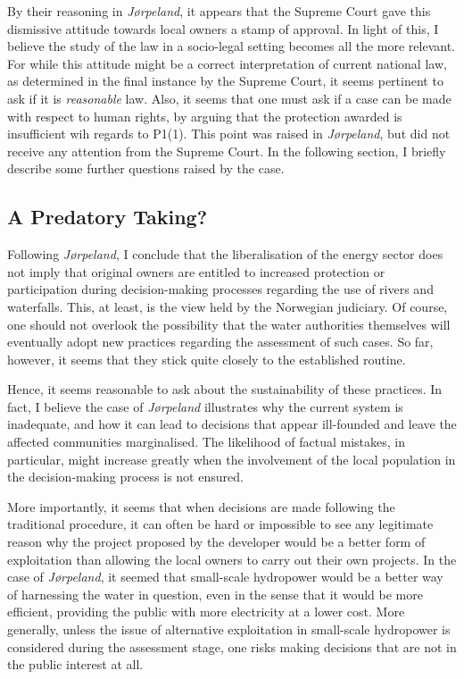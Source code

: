 By their reasoning in \emph{Jørpeland}, it appears that the Supreme Court gave this dismissive attitude towards local owners a stamp of approval. In light of this, I believe the study of the law in a socio-legal setting becomes all the more relevant. For while this attitude might be a correct interpretation of current national law, as determined in the final instance by the Supreme Court, it seems pertinent to ask if it is \emph{reasonable} law. Also, it seems that one must ask if a case can be made with respect to human rights, by arguing that the protection awarded is insufficient wih regards to P1(1). This point was raised in \emph{Jørpeland}, but did not receive any attention from the Supreme Court. In the following section, I briefly describe some further questions raised by the case.

\subsection{A Predatory Taking?}

Following \emph{Jørpeland}, I conclude that the liberalisation of the energy sector does not imply that original owners are entitled to increased protection or participation during decision-making processes regarding the use of rivers and waterfalls. This, at least, is the view held by the Norwegian judiciary. Of course, one should not overlook the possibility that the water authorities themselves will eventually adopt new practices regarding the assessment of such cases. So far, however, it seems that they stick quite closely to the established routine.

Hence, it seems reasonable to ask about the sustainability of these practices. In fact, I believe the case of \emph{Jørpeland} illustrates why the current system is inadequate, and how it can lead to decisions that appear ill-founded and leave the affected communities marginalised. The likelihood of factual mistakes, in particular, might increase greatly when the involvement of the local population in the decision-making process is not ensured.

More importantly, it seems that when decisions are made following the traditional procedure, it can often be hard or impossible to see any legitimate reason why the project proposed by the developer would be a better form of exploitation than allowing the local owners to carry out their own projects. In the case of \emph{Jørpeland}, it seemed that small-scale hydropower would be a better way of harnessing the water in question, even in the sense that it would be more efficient, providing the public with more electricity at a lower cost. More generally, unless the issue of alternative exploitation in small-scale hydropower is considered during the assessment stage, one risks making decisions that are not in the public interest at all. 

